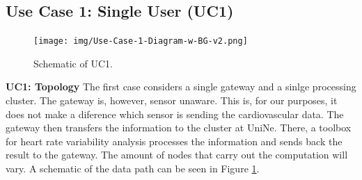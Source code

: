 \documentclass{article}
\begin{document}
\subsection{Use Case 1: Single User (UC1)} \label{subsection:use-case-1}

\begin{figure}
\centering
\texttt{[image: img/Use-Case-1-Diagram-w-BG-v2.png]}
\caption{Schematic of UC1. \label{fig:use-case-1}}
\end{figure}
\textbf{UC1: Topology}
The first case considers a single gateway and a sinlge processing cluster. The gateway is, however, sensor unaware. This is, for our purposes, it does not make a diference which sensor is sending the cardiovascular data. The gateway then transfers the information to the cluster at UniNe. There, a toolbox for heart rate variability analysis processes the information and sends back the result to the gateway. The amount of nodes that carry out the computation will vary. A schematic of the data path can be seen in Figure \ref{fig:use-case-1}.
\end{document}
